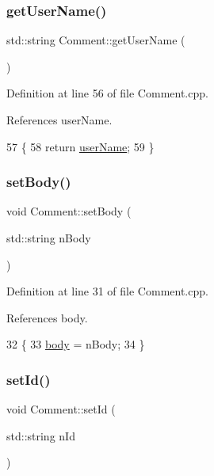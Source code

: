 \subsubsection{\texorpdfstring{get\+User\+Name()}{getUserName()}}
{\footnotesize\ttfamily std\+::string Comment\+::get\+User\+Name (\begin{DoxyParamCaption}{ }\end{DoxyParamCaption})}



Definition at line 56 of file Comment.\+cpp.



References user\+Name.


\begin{DoxyCode}
57 \{
58     \textcolor{keywordflow}{return} \hyperlink{class_comment_ad477f53e20e76aa9352926f93ccc7a56}{userName};
59 \}
\end{DoxyCode}
\mbox{\label{class_comment_abadebf70476d2ac212154fd52df103e7}} 
\subsubsection{\texorpdfstring{set\+Body()}{setBody()}}
{\footnotesize\ttfamily void Comment\+::set\+Body (\begin{DoxyParamCaption}\item[{std\+::string}]{n\+Body }\end{DoxyParamCaption})}



Definition at line 31 of file Comment.\+cpp.



References body.


\begin{DoxyCode}
32 \{
33     \hyperlink{class_comment_af8df10ee9d38440d5c4d500ccc9f2519}{body} = nBody;
34 \}
\end{DoxyCode}
\mbox{\label{class_comment_abb43aa20506c1d6cdb54c6b62e2b0d9d}} 
\subsubsection{\texorpdfstring{set\+Id()}{setId()}}
{\footnotesize\ttfamily void Comment\+::set\+Id (\begin{DoxyParamCaption}\item[{std\+::string}]{n\+Id }\end{DoxyParamCaption})}



